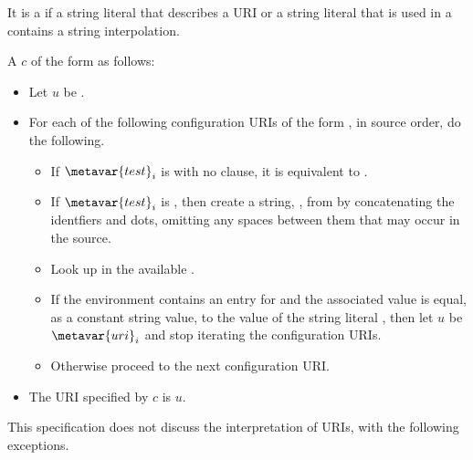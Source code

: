 \documentclass[makeidx]{article}
\begin{document}
\LMHash{}%
It is a  if a string literal that describes a URI
or a string literal that is used in a 
contains a string interpolation.

\LMHash{}%
A  $c$ of the form
 as follows:
\begin{itemize}
\item
  Let $u$ be .
\item
  For each of the following configuration URIs of the form
  ,
  in source order, do the following.
  \begin{itemize}
  \item
    If $\metavar{test}_i$ is 
    with no \lit{==} clause, it is
    equivalent to .
  \item
    If $\metavar{test}_i$ is ,
    then create a string, , from 
    by concatenating the identfiers and dots,
    omitting any spaces between them that may occur in the source.
  \item
    Look up  in the available
    .
  \item
    If the environment contains an entry for  and the
    associated value is equal, as a constant string value, to the value of
    the string literal ,
    then let $u$ be $\metavar{uri}_i$ and stop iterating the configuration URIs.
  \item
    Otherwise proceed to the next configuration URI.
  \end{itemize}
\item
  The URI specified by $c$ is $u$.
\end{itemize}

\LMHash{}%
This specification does not discuss the interpretation of URIs,
with the following exceptions.

\end{document}
